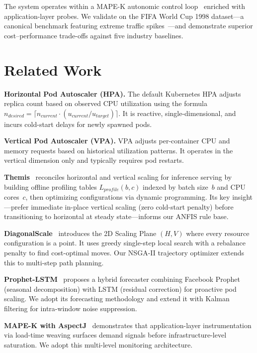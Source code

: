 \documentclass[conference]{IEEEtran}
\begin{document}
The system operates within a MAPE-K autonomic control loop~\cite{solino2025autonomic} enriched with application-layer probes. We validate on the FIFA World Cup 1998 dataset---a canonical benchmark featuring extreme traffic spikes~\cite{guruge2025time}---and demonstrate superior cost--performance trade-offs against five industry baselines.

\section{Related Work}
\label{sec:related}

\textbf{Horizontal Pod Autoscaler (HPA).} The default Kubernetes HPA adjusts replica count based on observed CPU utilization using the formula $n_{desired} = \lceil n_{current} \cdot (u_{current}/u_{target}) \rceil$. It is reactive, single-dimensional, and incurs cold-start delays for newly spawned pods.

\textbf{Vertical Pod Autoscaler (VPA).} VPA adjusts per-container CPU and memory requests based on historical utilization patterns. It operates in the vertical dimension only and typically requires pod restarts.

\textbf{Themis}~\cite{razavi2024tale} reconciles horizontal and vertical scaling for inference serving by building offline profiling tables $L_{profile}(b, c)$ indexed by batch size~$b$ and CPU cores~$c$, then optimizing configurations via dynamic programming. Its key insight---prefer immediate in-place vertical scaling (zero cold-start penalty) before transitioning to horizontal at steady state---informs our ANFIS rule base.

\textbf{DiagonalScale}~\cite{abdullah2025diagonal} introduces the 2D Scaling Plane $(H, V)$ where every resource configuration is a point. It uses greedy single-step local search with a rebalance penalty to find cost-optimal moves. Our NSGA-II trajectory optimizer extends this to multi-step path planning.

\textbf{Prophet-LSTM}~\cite{guruge2025time} proposes a hybrid forecaster combining Facebook Prophet (seasonal decomposition) with LSTM (residual correction) for proactive pod scaling. We adopt its forecasting methodology and extend it with Kalman filtering for intra-window noise suppression.

\textbf{MAPE-K with AspectJ}~\cite{solino2025autonomic} demonstrates that application-layer instrumentation via load-time weaving surfaces demand signals before infrastructure-level saturation. We adopt this multi-level monitoring architecture.
\end{document}
